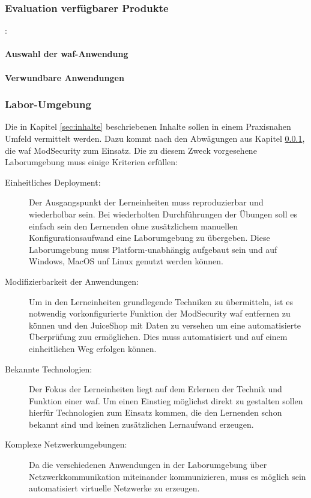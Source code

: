 \subsubsection{Evaluation verfügbarer Produkte}
\label{sec:produkt-eval}:
\paragraph{Auswahl der \ac{waf}-Anwendung}


\paragraph{Verwundbare Anwendungen}

\subsubsection{Labor-Umgebung}

Die in Kapitel \ref{sec:inhalte} beschriebenen Inhalte sollen in einem Praxisnahen Umfeld vermittelt werden.
Dazu kommt nach den Abwägungen aus Kapitel \ref{sec:produkt-eval}, die \ac{waf} ModSecurity zum Einsatz.
Die zu diesem Zweck vorgesehene Laborumgebung muss einige Kriterien erfüllen:
\begin{description}
    \item[Einheitliches Deployment:] Der Ausgangspunkt der Lerneinheiten muss reproduzierbar und wiederholbar sein. 
    Bei wiederholten Durchführungen der Übungen soll es einfach sein den Lernenden ohne zusätzlichem manuellen Konfigurationsaufwand eine Laborumgebung zu übergeben. 
    Diese Laborumgebung muss Platform-unabhängig aufgebaut sein und auf Windows, MacOS unf Linux genutzt werden können.
    \item[Modifizierbarkeit der Anwendungen:] Um in den Lerneinheiten grundlegende Techniken zu übermitteln, ist es notwendig vorkonfigurierte Funktion der ModSecurity \ac{waf} entfernen zu können und den JuiceShop mit Daten zu versehen um eine automatisierte Überprüfung zuu ermöglichen.
    Dies muss automatisiert und auf einem einheitlichen Weg erfolgen können.
    \item[Bekannte Technologien:] Der Fokus der Lerneinheiten liegt auf dem Erlernen der Technik und Funktion einer \ac{waf}. 
    Um einen Einstieg möglichst direkt zu gestalten sollen hierfür Technologien zum Einsatz kommen, die den Lernenden schon bekannt sind und keinen zusätzlichen Lernaufwand erzeugen.
    \item[Komplexe Netzwerkumgebungen:] Da die verschiedenen Anwendungen in der Laborumgebung über Netzwerkkommunikation miteinander kommunizieren, muss es möglich sein automatisiert virtuelle Netzwerke zu erzeugen.
\end{description}

